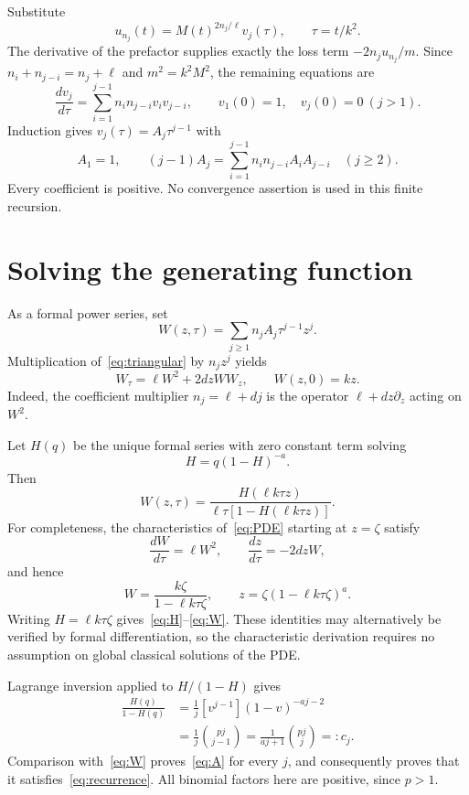 \documentclass[11pt,a4paper]{report}
\begin{document}
Substitute
\[
u_{n_j}(t)=M(t)^{2n_j/\ell}v_j(\tau),\qquad \tau=t/k^2.
\]
The derivative of the prefactor supplies exactly the loss term $-2n_j u_{n_j}/m$. Since $n_i+n_{j-i}=n_j+\ell$ and $m^2=k^2M^2$, the remaining equations are
\begin{equation}\label{eq:triangular}
\frac{dv_j}{d\tau}=\sum_{i=1}^{j-1}n_i n_{j-i}v_i v_{j-i},
\qquad v_1(0)=1,\quad v_j(0)=0\ (j>1).
\end{equation}
Induction gives $v_j(\tau)=A_j\tau^{j-1}$ with
\begin{equation}\label{eq:recurrence}
A_1=1,\qquad (j-1)A_j=\sum_{i=1}^{j-1}n_i n_{j-i}A_i A_{j-i}\quad(j\ge2).
\end{equation}
Every coefficient is positive. No convergence assertion is used in this finite recursion.

\section{Solving the generating function}
As a formal power series, set
\[
W(z,\tau)=\sum_{j\ge1}n_j A_j\tau^{j-1}z^j.
\]
Multiplication of~\eqref{eq:triangular} by $n_jz^j$ yields
\begin{equation}\label{eq:PDE}
W_\tau=\ell W^2+2dzWW_z,\qquad W(z,0)=kz.
\end{equation}
Indeed, the coefficient multiplier $n_j=\ell+dj$ is the operator $\ell+dz\partial_z$ acting on $W^2$.

Let $H(q)$ be the unique formal series with zero constant term solving
\begin{equation}\label{eq:H}
H=q(1-H)^{-a}.
\end{equation}
Then
\begin{equation}\label{eq:W}
W(z,\tau)=\frac{H(\ell k\tau z)}{\ell\tau[1-H(\ell k\tau z)]}.
\end{equation}
For completeness, the characteristics of~\eqref{eq:PDE} starting at $z=\zeta$ satisfy
\[
\frac{dW}{d\tau}=\ell W^2,\qquad \frac{dz}{d\tau}=-2dzW,
\]
and hence
\[
W=\frac{k\zeta}{1-\ell k\tau\zeta},\qquad
z=\zeta(1-\ell k\tau\zeta)^a.
\]
Writing $H=\ell k\tau\zeta$ gives~\eqref{eq:H}--\eqref{eq:W}. These identities may alternatively be verified by formal differentiation, so the characteristic derivation requires no assumption on global classical solutions of the PDE.

Lagrange inversion applied to $H/(1-H)$ gives
\begin{align}
[q^j]\frac{H(q)}{1-H(q)}
&=\frac1j[v^{j-1}](1-v)^{-aj-2}\\
&=\frac1j\binom{pj}{j-1}
=\frac{1}{aj+1}\binom{pj}{j}=:c_j.\label{eq:c}
\end{align}
Comparison with~\eqref{eq:W} proves~\eqref{eq:A} for every $j$, and consequently proves that it satisfies~\eqref{eq:recurrence}. All binomial factors here are positive, since $p>1$.
\end{document}
